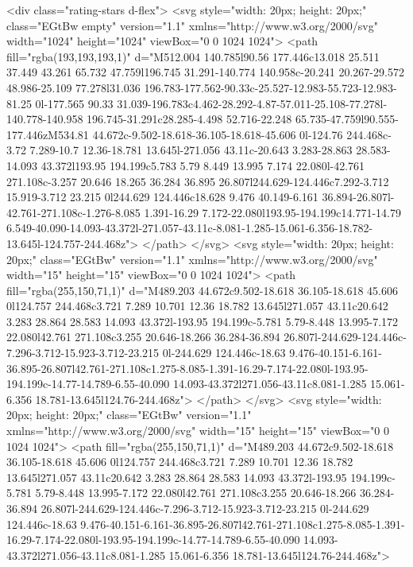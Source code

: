                 <div class="rating-stars d-flex">
                  <svg style="width: 20px; height: 20px;" class="EGtBw empty" version="1.1"
                    xmlns="http://www.w3.org/2000/svg" width="1024" height="1024" viewBox="0 0 1024 1024">
                    <path fill="rgba(193,193,193,1)"
                      d="M512.004 140.785l90.56 177.446c13.018 25.511 37.449 43.261 65.732 47.759l196.745 31.291-140.774 140.958c-20.241 20.267-29.572 48.986-25.109 77.278l31.036 196.783-177.562-90.33c-25.527-12.983-55.723-12.983-81.25 0l-177.565 90.33 31.039-196.783c4.462-28.292-4.87-57.011-25.108-77.278l-140.778-140.958 196.745-31.291c28.285-4.498 52.716-22.248 65.735-47.759l90.555-177.446zM534.81 44.672c-9.502-18.618-36.105-18.618-45.606 0l-124.76 244.468c-3.72 7.289-10.7 12.36-18.781 13.645l-271.056 43.11c-20.643 3.283-28.863 28.583-14.093 43.372l193.95 194.199c5.783 5.79 8.449 13.995 7.174 22.080l-42.761 271.108c-3.257 20.646 18.265 36.284 36.895 26.807l244.629-124.446c7.292-3.712 15.919-3.712 23.215 0l244.629 124.446c18.628 9.476 40.149-6.161 36.894-26.807l-42.761-271.108c-1.276-8.085 1.391-16.29 7.172-22.080l193.95-194.199c14.771-14.79 6.549-40.090-14.093-43.372l-271.057-43.11c-8.081-1.285-15.061-6.356-18.782-13.645l-124.757-244.468z">
                    </path>
                  </svg>
                  <svg style="width: 20px; height: 20px;" class="EGtBw" version="1.1"
                    xmlns="http://www.w3.org/2000/svg" width="15" height="15" viewBox="0 0 1024 1024">
                    <path fill="rgba(255,150,71,1)"
                      d="M489.203 44.672c9.502-18.618 36.105-18.618 45.606 0l124.757 244.468c3.721 7.289 10.701 12.36 18.782 13.645l271.057 43.11c20.642 3.283 28.864 28.583 14.093 43.372l-193.95 194.199c-5.781 5.79-8.448 13.995-7.172 22.080l42.761 271.108c3.255 20.646-18.266 36.284-36.894 26.807l-244.629-124.446c-7.296-3.712-15.923-3.712-23.215 0l-244.629 124.446c-18.63 9.476-40.151-6.161-36.895-26.807l42.761-271.108c1.275-8.085-1.391-16.29-7.174-22.080l-193.95-194.199c-14.77-14.789-6.55-40.090 14.093-43.372l271.056-43.11c8.081-1.285 15.061-6.356 18.781-13.645l124.76-244.468z">
                    </path>
                  </svg>
                  <svg style="width: 20px; height: 20px;" class="EGtBw" version="1.1"
                    xmlns="http://www.w3.org/2000/svg" width="15" height="15" viewBox="0 0 1024 1024">
                    <path fill="rgba(255,150,71,1)"
                      d="M489.203 44.672c9.502-18.618 36.105-18.618 45.606 0l124.757 244.468c3.721 7.289 10.701 12.36 18.782 13.645l271.057 43.11c20.642 3.283 28.864 28.583 14.093 43.372l-193.95 194.199c-5.781 5.79-8.448 13.995-7.172 22.080l42.761 271.108c3.255 20.646-18.266 36.284-36.894 26.807l-244.629-124.446c-7.296-3.712-15.923-3.712-23.215 0l-244.629 124.446c-18.63 9.476-40.151-6.161-36.895-26.807l42.761-271.108c1.275-8.085-1.391-16.29-7.174-22.080l-193.95-194.199c-14.77-14.789-6.55-40.090 14.093-43.372l271.056-43.11c8.081-1.285 15.061-6.356 18.781-13.645l124.76-244.468z">
